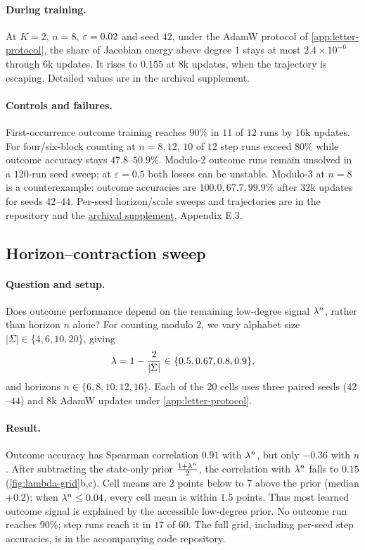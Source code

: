 \paragraph{During training.} At $K=2$, $n=8$, $\varepsilon=0.02$ and seed $42$, under the AdamW protocol of \cref{app:letter-protocol},
the share of Jacobian energy above degree $1$ stays at most $2.4\times10^{-6}$ through $6$k updates.
It rises to $0.155$ at $8$k updates, when the trajectory is escaping. Detailed values are in the archival supplement.



\paragraph{Controls and failures.}
First-occurrence outcome training reaches $90\%$ in $11$ of $12$ runs by $16$k updates.
For four/six-block counting at $n=8,12$, $10$ of $12$ step runs exceed $80\%$ while
outcome accuracy stays $47.8$--$50.9\%$. Modulo-$2$ outcome runs remain unsolved
in a $120$-run seed sweep; at $\varepsilon=0.5$ both losses can be unstable.
Modulo-$3$ at $n=8$ is a counterexample: outcome accuracies are
$100.0,67.7,99.9\%$ after $32$k updates for seeds $42$--$44$.
Per-seed horizon/scale sweeps and trajectories are in the repository and the
\href{archival_full_version.pdf}{archival supplement}, Appendix E.3.

\subsection{Horizon--contraction sweep}
\label{app:exp-lambda}
\paragraph{Question and setup.} Does outcome performance depend on the remaining low-degree signal $\lambda^n$, rather than horizon $n$ alone?
For counting modulo $2$, we vary alphabet size $|\Sigma|\in\{4,6,10,20\}$, giving
\[
 \lambda=1-\frac{2}{|\Sigma|}\in\{0.5,0.67,0.8,0.9\},
\]
and horizons $n\in\{6,8,10,12,16\}$. Each of the $20$ cells uses three paired seeds ($42$--$44$) and $8$k AdamW updates
under \cref{app:letter-protocol}.

\paragraph{Result.} Outcome accuracy has Spearman correlation $0.91$ with $\lambda^n$, but only $-0.36$ with $n$.
After subtracting the state-only prior $\frac{1+\lambda^n}{2}$, the correlation with $\lambda^n$ falls to $0.15$ (\cref{fig:lambda-grid}b,c).
Cell means are $2$ points below to $7$ above the prior (median $+0.2$); when $\lambda^n\le0.04$, every cell mean is within $1.5$ points.
Thus most learned outcome signal is explained by the accessible low-degree prior. No outcome run reaches $90\%$;
step runs reach it in $17$ of $60$. The full grid, including per-seed step accuracies, is in the accompanying code repository.

